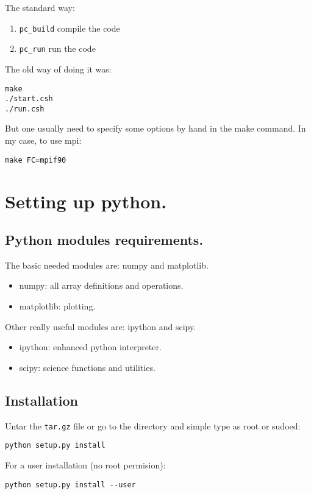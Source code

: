 \documentclass[a4paper,12pt]{article}
\begin{document}
The standard way:
\begin{enumerate}
  \item \verb|pc_build| compile the code
  \item \verb|pc_run| run the code
\end{enumerate}

The old way of doing it was:
\begin{verbatim}
make
./start.csh
./run.csh
\end{verbatim}
But one usually need to specify some options by hand in the make command. In my
case, to use mpi:
\begin{verbatim}
make FC=mpif90
\end{verbatim}

\section{Setting up python.}
\subsection{Python modules requirements.}
The basic needed modules are: numpy and matplotlib.
\begin{itemize}
 \item numpy: all array definitions and operations.
  \item matplotlib: plotting.
\end{itemize}

Other really useful modules are: ipython and scipy.

\begin{itemize}
 \item ipython: enhanced python interpreter.
  \item scipy: science functions and utilities.
\end{itemize}


\subsection{Installation}
Untar the \texttt{tar.gz} file or go to the directory and simple type as root or sudoed:
\begin{verbatim}
python setup.py install
\end{verbatim}
For a user installation (no root permision):
\begin{verbatim}
python setup.py install --user
\end{verbatim}
\end{document}
